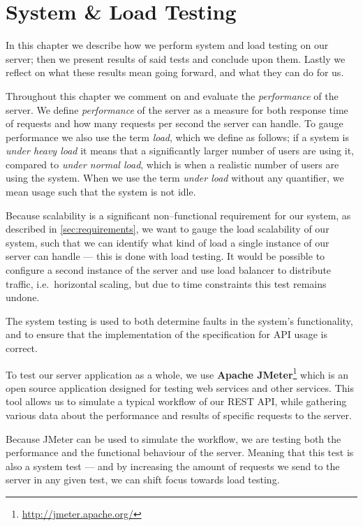 \section{System \& Load Testing}\label{cha:system_and_load_testing}
In this chapter we describe how we perform system and load testing on our server;
then we present results of said tests and conclude upon them.
Lastly we reflect on what these results mean going forward, and what they can do for us.

Throughout this chapter we comment on and evaluate the \textit{performance} of the server.
We define \textit{performance} of the server as a measure for both response time of requests and how many requests per second the server can handle.
To gauge performance we also use the term \textit{load}, which we define as follows;
if a system is \textit{under heavy load} it means that a significantly larger number of users are using it, compared to \textit{under normal load}, which is when a realistic number of users are using the system.
When we use the term \textit{under load} without any quantifier, we mean usage such that the system is not idle.

\bigskip
Because scalability is a significant non--functional requirement for our system, as described in \cref{sec:requirements}, we want to gauge the load scalability of our system, such that we can identify what kind of load a single instance of our server can handle --- this is done with load testing. %
It would be possible to configure a second instance of the server and use load balancer to distribute traffic, i.e.~horizontal scaling, but due to time constraints this test remains undone.

The system testing is used to both determine faults in the system's functionality, and to ensure that the implementation of the specification for API usage is correct.

\bigskip
To test our server application as a whole, we use \textbf{Apache JMeter}\footnote{\url{http://jmeter.apache.org/}} which is an open source application designed for testing web services and other services.
This tool allows us to simulate a typical workflow of our REST API, while gathering various data about the performance and results of specific requests to the server.

Because JMeter can be used to simulate the workflow, we are testing both the performance and the functional behaviour of the server.
Meaning that this test is also a system test --- and by increasing the amount of requests we send to the server in any given test, we can shift focus towards load testing.

